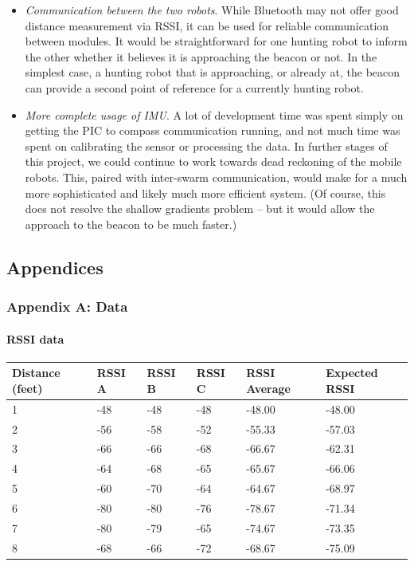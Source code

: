 \documentclass[]{article}
\providecommand{\tightlist}{%
  \setlength{\itemsep}{0pt}\setlength{\parskip}{0pt}}
\let\oldparagraph\paragraph
\renewcommand{\paragraph}[1]{\oldparagraph{#1}\mbox{}}
\begin{document}
\begin{itemize}
\tightlist
\item
  \emph{Communication between the two robots}. While Bluetooth may not
  offer good distance measurement via RSSI, it can be used for reliable
  communication between modules. It would be straightforward for one
  hunting robot to inform the other whether it believes it is
  approaching the beacon or not. In the simplest case, a hunting robot
  that is approaching, or already at, the beacon can provide a second
  point of reference for a currently hunting robot.
\item
  \emph{More complete usage of IMU}. A lot of development time was spent
  simply on getting the PIC to compass communication running, and not
  much time was spent on calibrating the sensor or processing the data.
  In further stages of this project, we could continue to work towards
  dead reckoning of the mobile robots. This, paired with inter-swarm
  communication, would make for a much more sophisticated and likely
  much more efficient system. (Of course, this does not resolve the
  shallow gradients problem -- but it would allow the approach to the
  beacon to be much faster.)
\end{itemize}

\hypertarget{appendices}{%
\subsection{Appendices}\label{appendices}}

\hypertarget{appendix-c-schematics}{%
\subsubsection{Appendix A: Data}\label{appendix-c-schematics}}

\hypertarget{rssi-data}{%
\paragraph{RSSI data}\label{rssi-data}}

\begin{longtable}[]{@{}llllll@{}}
\toprule
Distance (feet) & RSSI A & RSSI B & RSSI C & RSSI Average & Expected
RSSI\tabularnewline
\midrule
\endhead
1 & -48 & -48 & -48 & -48.00 & -48.00\tabularnewline
2 & -56 & -58 & -52 & -55.33 & -57.03\tabularnewline
3 & -66 & -66 & -68 & -66.67 & -62.31\tabularnewline
4 & -64 & -68 & -65 & -65.67 & -66.06\tabularnewline
5 & -60 & -70 & -64 & -64.67 & -68.97\tabularnewline
6 & -80 & -80 & -76 & -78.67 & -71.34\tabularnewline
7 & -80 & -79 & -65 & -74.67 & -73.35\tabularnewline
8 & -68 & -66 & -72 & -68.67 & -75.09\tabularnewline
\bottomrule
\end{longtable}
\end{document}
